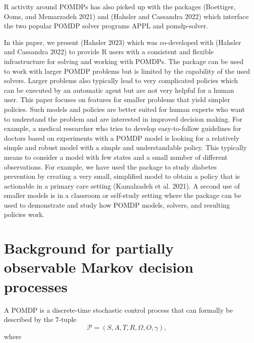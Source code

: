 R activity around POMDPs has also picked up with the packages  (Boettiger, Ooms, and Memarzadeh 2021) and  (Hahsler and Cassandra 2022) which interface the
two popular POMDP solver programs APPL and pomdp-solver.

In this paper, we present  (Hahsler 2023) which was co-developed with
 (Hahsler and Cassandra 2022) to provide R users with
a consistent and flexible infrastructure for solving and working with
POMDPs. The package can be used to work with larger POMDP problems but is limited
by the capability of the used solvers. Larger problems also typically lead to
very complicated policies which can be executed by an automatic agent but
are not very helpful for a human user. This paper
focuses on features for smaller problems that yield simpler policies. Such models and
policies are better suited for human experts who want to understand the problem and
are interested in improved decision making.
For example, a medical researcher who tries to
develop easy-to-follow guidelines for doctors based on experiments with a POMDP model
is looking for a relatively simple and robust model with a simple and
understandable policy.
This typically means
to consider a model with few states and a small number of different observations.
For example, we have used the package to study diabetes
prevention by creating a very small, simplified model
to obtain a policy that is actionable in a primary care setting (Kamalzadeh et al. 2021).
A second use of smaller models is in a classroom or self-study setting where the 
package can be used to demonstrate and study how POMDP models, solvers, and resulting
policies work.

\hypertarget{background-for-partially-observable-markov-decision-processes}{%
\section{Background for partially observable Markov decision processes}\label{background-for-partially-observable-markov-decision-processes}}

A POMDP is a discrete-time stochastic control process that can formally be described by the 7-tuple
\[\mathcal{P} = (S, A, T, R, \Omega , O, \gamma),\] where

